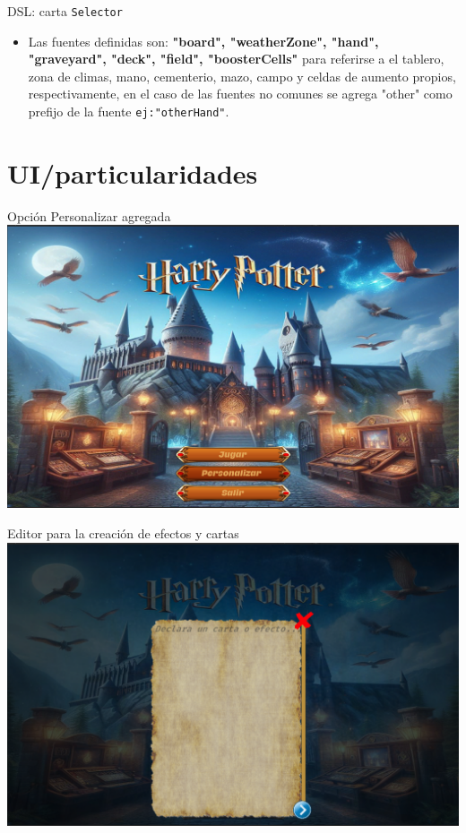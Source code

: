 \documentclass[a4paper, 12pt]{beamer}
\begin{document}
\begin{frame}{\textcolor{plata}{DSL: carta}}
\texttt{Selector}\\
\begin{itemize}
\item Las fuentes definidas son:  \textbf{"board", "weatherZone", "hand", "graveyard", "deck", "field", "boosterCells"} para referirse a el tablero, zona de climas, mano, cementerio, mazo, campo y celdas de aumento propios, respectivamente, en el caso de las fuentes no comunes se agrega "other" como prefijo de la fuente \texttt{ej:"otherHand"}.
\end{itemize}
\end{frame}

\section{UI/particularidades}
\begin{frame}{\textcolor{plata}{Opción Personalizar agregada}}
\includegraphics[scale = 0.2]{images/image10.png}
\end{frame}

\begin{frame}{\textcolor{plata}{Editor para la creación de efectos y cartas}}
\includegraphics[scale = 0.2]{images/image11.png}
\end{frame}
\end{document}
